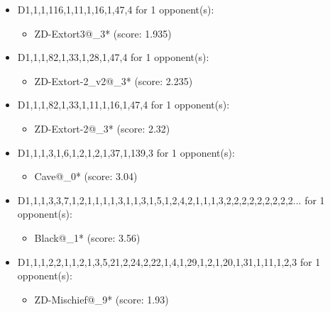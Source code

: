 \begin{appendices}
\begin{itemize}
    \item D1,1,1,116,1,11,1,16,1,47,4 for 1 opponent(s):
    \begin{multicols}{3}
         \begin{itemize}
            \item ZD-Extort3@\_3* (score: 1.935)
        \end{itemize}
     \end{multicols}
     
    \item D1,1,1,82,1,33,1,28,1,47,4 for 1 opponent(s):
    \begin{multicols}{3}
         \begin{itemize}
            \item ZD-Extort-2\_v2@\_3* (score: 2.235)
        \end{itemize}
     \end{multicols}
     
    \item D1,1,1,82,1,33,1,11,1,16,1,47,4 for 1 opponent(s):
    \begin{multicols}{3}
         \begin{itemize}
            \item ZD-Extort-2@\_3* (score: 2.32)
        \end{itemize}
     \end{multicols}
     
    \item D1,1,1,3,1,6,1,2,1,2,1,37,1,139,3 for 1 opponent(s):
    \begin{multicols}{3}
         \begin{itemize}
            \item Cave@\_0* (score: 3.04)
        \end{itemize}
     \end{multicols}
     
    \item D1,1,1,3,3,7,1,2,1,1,1,1,3,1,1,3,1,5,1,2,4,2,1,1,1,3,2,2,2,2,2,2,2,2,2... for 1 opponent(s):
    \begin{multicols}{3}
         \begin{itemize}
            \item Black@\_1* (score: 3.56)
        \end{itemize}
     \end{multicols}
     
    \item D1,1,1,2,2,1,1,2,1,3,5,21,2,24,2,22,1,4,1,29,1,2,1,20,1,31,1,11,1,2,3 for 1 opponent(s):
    \begin{multicols}{3}
         \begin{itemize}
            \item ZD-Mischief@\_9* (score: 1.93)
        \end{itemize}
     \end{multicols}
     

\end{itemize}
\end{appendices}

